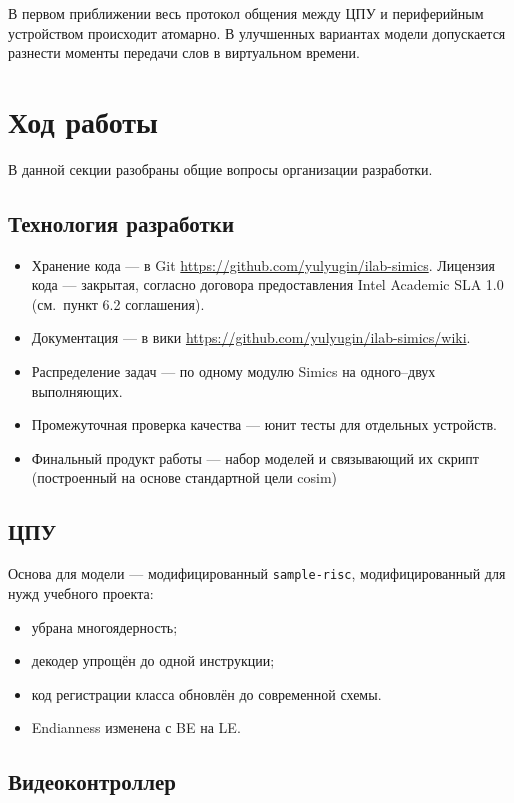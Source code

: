 В первом приближении весь протокол общения между ЦПУ и периферийным устройством происходит атомарно. В улучшенных вариантах модели допускается разнести моменты передачи слов в виртуальном времени.

\section{Ход работы}

В данной секции разобраны общие вопросы организации разработки.
\subsection{Технология разработки}

\begin{itemize}
\item Хранение кода --- в Git \url{https://github.com/yulyugin/ilab-simics}. Лицензия кода --- закрытая, согласно договора предоставления Intel Academic SLA 1.0 (см.~пункт 6.2 соглашения).

\item Документация --- в вики \url{https://github.com/yulyugin/ilab-simics/wiki}.

\item Распределение задач --- по одному модулю Simics на одного--двух выполняющих.
\item Промежуточная проверка качества --- юнит тесты для отдельных устройств.
\item Финальный продукт работы --- набор моделей и связывающий их скрипт (построенный на основе стандартной цели cosim)
\end{itemize}

\subsection{ЦПУ}

Основа для модели --- модифицированный \texttt{sample-risc}, модифицированный для нужд учебного проекта:
\begin{itemize}
    \item убрана многоядерность;
    \item декодер упрощён до одной инструкции;
	\item код регистрации класса обновлён до современной схемы.
	\item Endianness изменена с BE на LE.
\end{itemize}


\subsection{Видеоконтроллер}

